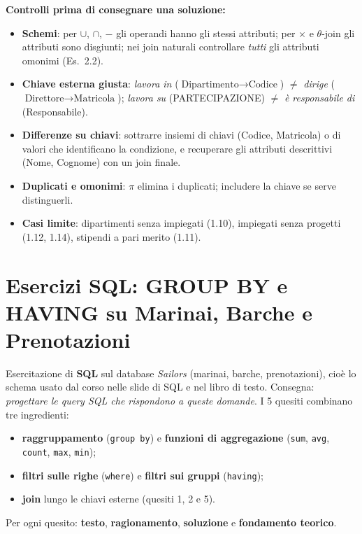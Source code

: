 \documentclass[12pt, a4paper]{article}
\begin{document}
\textbf{Controlli prima di consegnare una soluzione:}
\begin{itemize}
\item \textbf{Schemi}: per $\cup$, $\cap$, $-$ gli operandi hanno gli stessi attributi; per $\times$ e $\theta$-join gli attributi sono disgiunti; nei join naturali controllare \emph{tutti} gli attributi omonimi (Es.~2.2).
\item \textbf{Chiave esterna giusta}: \emph{lavora in} ($\text{Dipartimento}\to\text{Codice}$) $\neq$ \emph{dirige} ($\text{Direttore}\to\text{Matricola}$); \emph{lavora su} (PARTECIPAZIONE) $\neq$ \emph{è responsabile di} (Responsabile).
\item \textbf{Differenze su chiavi}: sottrarre insiemi di chiavi (Codice, Matricola) o di valori che identificano la condizione, e recuperare gli attributi descrittivi (Nome, Cognome) con un join finale.
\item \textbf{Duplicati e omonimi}: $\pi$ elimina i duplicati; includere la chiave se serve distinguerli.
\item \textbf{Casi limite}: dipartimenti senza impiegati (1.10), impiegati senza progetti (1.12, 1.14), stipendi a pari merito (1.11).
\end{itemize}

\section{Esercizi SQL: GROUP BY e HAVING su Marinai, Barche e Prenotazioni}

Esercitazione di \textbf{SQL} sul database \textit{Sailors} (marinai, barche, prenotazioni), cioè lo schema usato dal corso nelle slide di SQL e nel libro di testo. Consegna: \emph{progettare le query SQL che rispondono a queste domande}. I 5 quesiti combinano tre ingredienti:
\begin{itemize}
\item \textbf{raggruppamento} (\texttt{group by}) e \textbf{funzioni di aggregazione} (\texttt{sum}, \texttt{avg}, \texttt{count}, \texttt{max}, \texttt{min});
\item \textbf{filtri sulle righe} (\texttt{where}) e \textbf{filtri sui gruppi} (\texttt{having});
\item \textbf{join} lungo le chiavi esterne (quesiti 1, 2 e 5).
\end{itemize}
Per ogni quesito: \textbf{testo}, \textbf{ragionamento}, \textbf{soluzione} e \textbf{fondamento teorico}.
\end{document}
